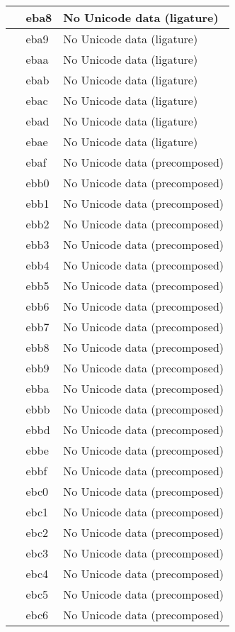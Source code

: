 \documentclass[12pt,letterpaper,openany]{book}
\begin{document}
\begin{center}
\begin{supertabular}{|m{0.25in}|m{0.5in}|m{4in}|}
 & eba8 & No Unicode data (ligature)\\\hline
 & eba9 & No Unicode data (ligature)\\\hline
 & ebaa & No Unicode data (ligature)\\\hline
 & ebab & No Unicode data (ligature)\\\hline
 & ebac & No Unicode data (ligature)\\\hline
 & ebad & No Unicode data (ligature)\\\hline
 & ebae & No Unicode data (ligature)\\\hline
 & ebaf & No Unicode data (precomposed)\\\hline
 & ebb0 & No Unicode data (precomposed)\\\hline
 & ebb1 & No Unicode data (precomposed)\\\hline
 & ebb2 & No Unicode data (precomposed)\\\hline
 & ebb3 & No Unicode data (precomposed)\\\hline
 & ebb4 & No Unicode data (precomposed)\\\hline
 & ebb5 & No Unicode data (precomposed)\\\hline
 & ebb6 & No Unicode data (precomposed)\\\hline
 & ebb7 & No Unicode data (precomposed)\\\hline
 & ebb8 & No Unicode data (precomposed)\\\hline
 & ebb9 & No Unicode data (precomposed)\\\hline
 & ebba & No Unicode data (precomposed)\\\hline
 & ebbb & No Unicode data (precomposed)\\\hline
 & ebbd & No Unicode data (precomposed)\\\hline
 & ebbe & No Unicode data (precomposed)\\\hline
 & ebbf & No Unicode data (precomposed)\\\hline
 & ebc0 & No Unicode data (precomposed)\\\hline
 & ebc1 & No Unicode data (precomposed)\\\hline
 & ebc2 & No Unicode data (precomposed)\\\hline
 & ebc3 & No Unicode data (precomposed)\\\hline
 & ebc4 & No Unicode data (precomposed)\\\hline
 & ebc5 & No Unicode data (precomposed)\\\hline
 & ebc6 & No Unicode data (precomposed)\\\hline

\end{supertabular}
\end{center}
\end{document}
